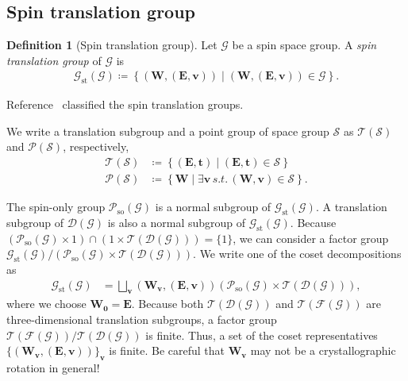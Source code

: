 \documentclass[a4paper, 11pt]{article}
\theoremstyle{definition}
\newcommand{\term}[1]{\textit{#1}}
\newcommand{\relmiddle}[1]{\mathrel{}\middle#1\mathrel{}}
\newcommand{\set}[2]{\left\{ #1 \relmiddle| #2 \right\}}
\newtheorem{definition}[theorem]{Definition}
\begin{document}
\subsection{Spin translation group}

\begin{screen}
  \begin{definition}[Spin translation group]
    Let $\mathcal{G}$ be a spin space group.
    A \term{spin translation group} of $\mathcal{G}$ is
    \begin{align}
      \mathcal{G}_{\mathrm{st}}(\mathcal{G})
      \coloneqq
      \set{ (\bm{W}, (\bm{E}, \bm{v})) }{ (\bm{W}, (\bm{E}, \bm{v})) \in \mathcal{G}}.
    \end{align}
  \end{definition}
\end{screen}

Reference~\cite{Litvin:a09793} classified the spin translation groups.

We write a translation subgroup and a point group of space group $\mathcal{S}$ as $\mathcal{T}(\mathcal{S})$ and $\mathcal{P}(\mathcal{S})$, respectively,
\begin{align}
  \mathcal{T}(\mathcal{S}) &\coloneqq \set{ (\bm{E}, \bm{t}) }{ (\bm{E}, \bm{t}) \in \mathcal{S} } \\
  \mathcal{P}(\mathcal{S}) &\coloneqq \set{ \bm{W} }{ \exists \bm{v} \, s.t.\, (\bm{W}, \bm{v}) \in \mathcal{S} }.
\end{align}

The spin-only group $\mathcal{P}_{\mathrm{so}}(\mathcal{G})$ is a normal subgroup of $\mathcal{G}_{\mathrm{st}}(\mathcal{G})$.
A translation subgroup of $\mathcal{D}(\mathcal{G})$ is also a normal subgroup of $\mathcal{G}_{\mathrm{st}}(\mathcal{G})$.
Because $(\mathcal{P}_{\mathrm{so}}(\mathcal{G}) \times 1) \cap (1 \times \mathcal{T}(\mathcal{D}(\mathcal{G}))) = \{ 1 \}$, we can consider a factor group $\mathcal{G}_{\mathrm{st}}(\mathcal{G}) / (\mathcal{P}_{\mathrm{so}}(\mathcal{G}) \times \mathcal{T}(\mathcal{D}(\mathcal{G})))$.
We write one of the coset decompositions as
\begin{align}
  \mathcal{G}_{\mathrm{st}}(\mathcal{G})
    &= \bigsqcup_{ \bm{v} }
        (\bm{W}_{\bm{v}}, (\bm{E}, \bm{v}))
        \left( \mathcal{P}_{\mathrm{so}}(\mathcal{G}) \times \mathcal{T}(\mathcal{D}(\mathcal{G})) \right),
\end{align}
where we choose $\bm{W}_{\bm{0}} = \bm{E}$.
Because both $\mathcal{T}(\mathcal{D}(\mathcal{G}))$ and $\mathcal{T}(\mathcal{F}(\mathcal{G}))$ are three-dimensional translation subgroups, a factor group $\mathcal{T}(\mathcal{F}(\mathcal{G})) / \mathcal{T}(\mathcal{D}(\mathcal{G}))$ is finite.
Thus, a set of the coset representatives $\{ (\bm{W}_{\bm{v}}, (\bm{E}, \bm{v})) \}_{\bm{v}}$ is finite.
Be careful that $\bm{W}_{\bm{v}}$ may not be a crystallographic rotation in general!
\end{document}
